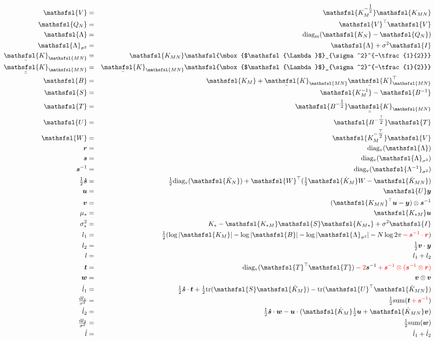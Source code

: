 \documentclass[12pt]{article}
\newcommand{\red}{\textcolor{red}}
\newcommand{\dif}{\mathrm{d}}
\newcommand{\myu}[1]{\underaccent{\bar}{#1}}
\newcommand{\onehalf}{\tfrac{1}{2}}
\newcommand{\mat}[1]{\mbox{$\mathsfsl{#1}$}}
\newcommand{\myvec}[1]{\mbox{\boldmath$#1$}}
\newcommand{\diagv}[1]{\mathrm{diag_v}(#1)}
\newcommand{\diagm}[1]{\mathrm{diag_m}(#1)}
\newcommand{\trace}[1]{\mathrm{tr}(#1)}
\newcommand{\transm}[1]{\mat{#1}^\top}
\newcommand{\imat}[1]{\mat{#1^{-1}}}
\newcommand{\ichol}[1]{\mat{#1^{-\onehalf}}}
\newcommand{\icholt}[1]{\mat{#1^{-\tfrac{\top}{2}}}}
\newcommand{\Km}{\mat{K_M}}
\newcommand{\dKm}{\mat{\dot{K}_M}}
\newcommand{\dkn}{\mat{\dot{K}_N}}
\newcommand{\Kmn}{\mat{K_{MN}}}
\newcommand{\Knm}{\transm{K_{MN}}}
\newcommand{\uKnm}{\myu{\mat{K}}_{\mathsfsl{MN}}^\top}
\newcommand{\dKmn}{\mat{\dot{K}_{MN}}}
\newcommand{\uKmn}{\myu{\mat{K}}_{\mathsfsl{MN}}}
\newcommand{\uuKmn}{\myu{\myu{\mat{K}}}_{\mathsfsl{MN}}}
\newcommand{\dl}{\dot{l}}
\newcommand{\vecr}{\myvec{r}}
\newcommand{\vecs}{\myvec{s}}
\newcommand{\vect}{\myvec{t}}
\newcommand{\vecu}{\myvec{u}}
\newcommand{\vecv}{\myvec{v}}
\newcommand{\vecw}{\myvec{w}}
\newcommand{\vecy}{\myvec{y}}
\newcommand{\vecsdh}{\onehalf\myvec{\dot{s}}}
\newcommand{\vecis}{\myvec{s}^{-1}}
\newcommand{\matB}{\mat{B}}
\newcommand{\matI}{\mat{I}}
\newcommand{\matS}{\mat{S}}
\newcommand{\matT}{\mat{T}}
\newcommand{\matU}{\mat{U}}
\newcommand{\matV}{\mat{V}}
\newcommand{\matW}{\mat{W}}
\newcommand{\Lam}{\mat{\Lambda}}
\newcommand{\Lamss}{\mat{\Lambda}_{\sigma^2}}
\newcommand{\Lamssi}{\imat{\Lambda}_{\sigma^2}}
\begin{document}
\begin{eqnarray*}
\matV & = & \ichol{K_M}\Kmn \\
\mat{Q_N} & = & \transm{V} \matV \\
\Lam & = & \diagm{\mat{K_N} - \mat{Q_N}} \\
\Lamss & = & \Lam + \sigma^2 \matI \\
\uKmn & = & \Kmn \ichol{\Lamss} \\
\uuKmn & = & \uKmn\ichol{\Lamss} \\
\matB & = & \Km + \uKmn\uKnm \\
\matS & = & \imat{K_M} - \imat{B} \\
\matT & = & \ichol{B}\uuKmn \\
\matU & = & \icholt{B}\matT \\
\matW & = & \icholt{K_M}\mat{V} \\
\vecr & = & \diagv{\Lam} \\
\vecs & = & \diagv{\Lamss} \\
\vecis & = & \diagv{\Lamssi} \\
\vecsdh & = & \onehalf\diagv{\dkn} + \transm{W}(\onehalf\dKm W - \dKmn) \\
\vecu & = & \matU \vecy \\
\vecv & = & (\Knm \vecu - \vecy) \otimes \vecis \\
\mu_* & = & \mat{K_{*M}} \vecu \\
\sigma^2_* & = & K_* - \mat{K_{*M}}\matS\mat{K_{M*}} + \sigma^2 \matI \\
l_1 & = & \onehalf (\log|\Km| - \log|\matB| - \log|\Lamss| - N \log 2\pi \red{\, - \, \vecis \cdot \vecr}) \\
l_2 & = & \onehalf \vecv\cdot\vecy \\
l & = & l_1 + l_2 \\
\vect & = & \diagv{\transm{T}\matT} - \red{2} \vecis \red{\, + \, \vecis\otimes(\vecis \otimes \vecr)} \\
\vecw & = & \vecv \otimes \vecv \\
\dl_1 & = & \vecsdh\cdot\vect + \onehalf\trace{\matS\dKm} - \trace{\transm{U}\dKmn} \\
\tfrac{\dif l_1}{\sigma^2} & = & \onehalf \mathrm{sum} (\vect \red {\, + \, \vecis}) \\
\dl_2 & = & \vecsdh\cdot\vecw - \vecu\cdot(\dKm \onehalf \vecu + \dKmn \vecv) \\
\tfrac{\dif l_2}{\sigma^2} & = & \onehalf \mathrm{sum}(\vecw) \\
\dl & = & \dl_1 + \dl_2 \\
\end{eqnarray*}
\end{document}
